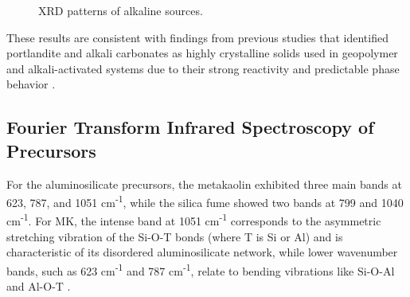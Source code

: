\begin{figure}[H]
    \centering
    \caption{XRD patterns of alkaline sources.}
    \label{fig:xrd_alkaline_sources}
\end{figure}

These results are consistent with findings from previous studies that identified portlandite and alkali carbonates as highly crystalline solids used in geopolymer and alkali-activated systems due to their strong reactivity and predictable phase behavior \cite{Provis2014}.

\subsection{Fourier Transform Infrared Spectroscopy of Precursors}

For the aluminosilicate precursors, the metakaolin exhibited three main bands at 623, 787, and 1051 cm\textsuperscript{-1}, while the silica fume showed two bands at 799 and 1040 cm\textsuperscript{-1}.
For MK, the intense band at 1051 cm\textsuperscript{-1} corresponds to the asymmetric stretching vibration of the Si-O-T bonds (where T is Si or Al) and is characteristic of its disordered aluminosilicate network, while lower wavenumber bands, such as 623 cm\textsuperscript{-1} and 787 cm\textsuperscript{-1}, relate to bending vibrations like Si-O-Al and Al-O-T \cite{moraes2024scsa}.

